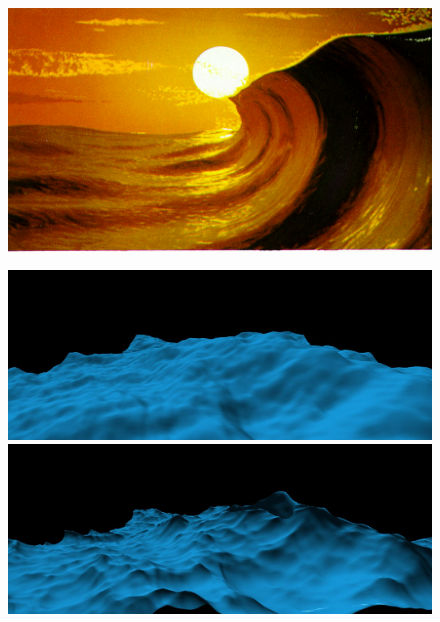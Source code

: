 \begin{figure}
 \subtop
 {
  \includegraphics[scale=0.25]{figures/A_Simple_Model_of_Ocean_Waves_-_Fournier_1986-013.png}
	}
\end{figure}

\begin{figure}
 \centering
 \subtop
 {
  \includegraphics[scale=0.125]{figures/Simulating_Ocean_Water-012.png}
 }
 \subtop
 {
  \includegraphics[scale=0.125]{figures/Simulating_Ocean_Water-013.png}
 }
\end{figure}

